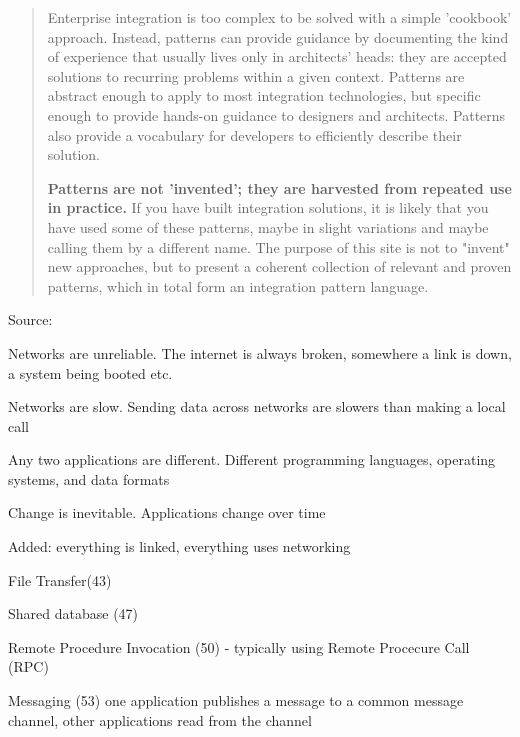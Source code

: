 \documentclass[Screen16to9,17pt]{foils}
\begin{document}

\begin{quote}
Enterprise integration is too complex to be solved with a simple 'cookbook' approach. Instead, patterns can provide guidance by documenting the kind of experience that usually lives only in architects' heads: they are accepted solutions to recurring problems within a given context. Patterns are abstract enough to apply to most integration technologies, but specific enough to provide hands-on guidance to designers and architects. Patterns also provide a vocabulary for developers to efficiently describe their solution.

{\bf
Patterns are not 'invented'; they are harvested from repeated use in practice.} If you have built integration solutions, it is likely that you have used some of these patterns, maybe in slight variations and maybe calling them by a different name. The purpose of this site is not to "invent" new approaches, but to present a coherent collection of relevant and proven patterns, which in total form an integration pattern language.
\end{quote}

Source:\\





\begin{list2}
\item Networks are unreliable. The internet is always broken, somewhere a link is down, a system being booted etc.
\item Networks are slow. Sending data across networks are slowers than making a local call
\item Any two applications are different. Different programming languages, operating systems, and data formats
\item Change is inevitable. Applications change over time
\item Added: everything is linked, everything uses networking
\end{list2}


\begin{list2}
\item File Transfer(43)
\item Shared database (47)
\item Remote Procedure Invocation (50) - typically using Remote Procecure Call (RPC)
\item Messaging (53) one application publishes a message to a common message channel, other applications read from the channel
\end{list2}
\end{document}
